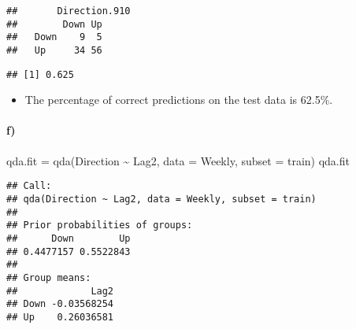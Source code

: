 \documentclass[
]{article}
\newenvironment{Shaded}{\begin{snugshade}}{\end{snugshade}}
\newcommand{\AttributeTok}[1]{\textcolor[rgb]{0.77,0.63,0.00}{#1}}
\newcommand{\FloatTok}[1]{\textcolor[rgb]{0.00,0.00,0.81}{#1}}
\newcommand{\FunctionTok}[1]{\textcolor[rgb]{0.00,0.00,0.00}{#1}}
\newcommand{\NormalTok}[1]{#1}
\newcommand{\OtherTok}[1]{\textcolor[rgb]{0.56,0.35,0.01}{#1}}
\newcommand{\SpecialCharTok}[1]{\textcolor[rgb]{0.00,0.00,0.00}{#1}}
\providecommand{\tightlist}{%
  \setlength{\itemsep}{0pt}\setlength{\parskip}{0pt}}
\begin{document}
\begin{verbatim}
##       Direction.910
##        Down Up
##   Down    9  5
##   Up     34 56
\end{verbatim}

\begin{Shaded}
\end{Shaded}

\begin{verbatim}
## [1] 0.625
\end{verbatim}

\begin{itemize}
\tightlist
\item
  The percentage of correct predictions on the test data is 62.5\%.
\end{itemize}

\hypertarget{f}{%
\paragraph{f)}\label{f}}

\begin{Shaded}
\begin{Highlighting}[]
\NormalTok{qda.fit }\OtherTok{=} \FunctionTok{qda}\NormalTok{(Direction }\SpecialCharTok{\textasciitilde{}}\NormalTok{ Lag2, }\AttributeTok{data =}\NormalTok{ Weekly, }\AttributeTok{subset =}\NormalTok{ train)}
\NormalTok{qda.fit }
\end{Highlighting}
\end{Shaded}

\begin{verbatim}
## Call:
## qda(Direction ~ Lag2, data = Weekly, subset = train)
## 
## Prior probabilities of groups:
##      Down        Up 
## 0.4477157 0.5522843 
## 
## Group means:
##             Lag2
## Down -0.03568254
## Up    0.26036581
\end{verbatim}

\begin{Shaded}
\end{Shaded}
\end{document}
